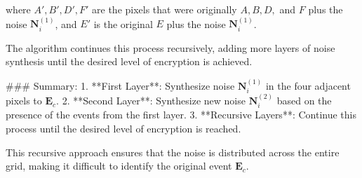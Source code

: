 where \(A', B', D', F'\) are the pixels that were originally \(A, B, D,\) and \(F\) plus the noise \(\mathbf{N}^{(1)}_i\), and \(E'\) is the original \(E\) plus the noise \(\mathbf{N}^{(1)}_i\).

The algorithm continues this process recursively, adding more layers of noise synthesis until the desired level of encryption is achieved.

### Summary:
1. **First Layer**: Synthesize noise \(\mathbf{N}^{(1)}_i\) in the four adjacent pixels to \(\mathbf{E}_c\).
2. **Second Layer**: Synthesize new noise \(\mathbf{N}^{(2)}_i\) based on the presence of the events from the first layer.
3. **Recursive Layers**: Continue this process until the desired level of encryption is reached.

This recursive approach ensures that the noise is distributed across the entire grid, making it difficult to identify the original event \(\mathbf{E}_c\).